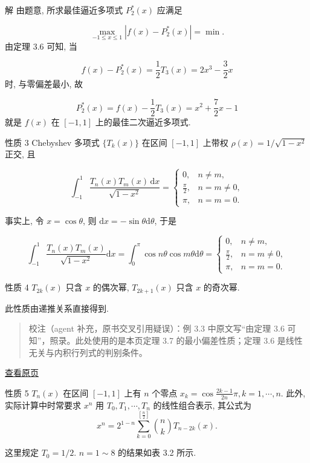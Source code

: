 \documentclass[
  10pt,
  fontset=fandol]{ctexart}
\begin{document}
解 由题意, 所求最佳逼近多项式 \(P_{2}^*(x)\) 应满足

\[
\max_{-1 \leqslant x \leqslant 1} |f(x) - P_{2}^*(x)| = \min .
\] 由定理 3.6 可知, 当

\[
f(x) - P_{2}^*(x) = \frac{1}{2} T_3(x) = 2x^3 - \frac{3}{2}x
\] 时, 与零偏差最小, 故

\[
P_{2}^*(x) = f(x) - \frac{1}{2} T_3(x) = x^2 + \frac{7}{2}x - 1
\] 就是 \(f(x)\) 在 \([-1,1]\) 上的最佳二次逼近多项式.

性质 3 Chebyshev 多项式 \(\{T_k(x)\}\) 在区间 \([-1,1]\) 上带权 \(\rho(x) = 1 / \sqrt{1-x^2}\) 正交, 且

\[
\int_{-1}^{1} \frac{T_n(x)T_m(x)\,\mathrm{d}x}{\sqrt{1-x^2}} = \begin{cases} 0, & n \neq m, \\ \frac{\pi}{2}, & n = m \neq 0, \\ \pi, & n = m = 0. \end{cases} \tag{3.4.8}
\]

事实上, 令 \(x = \cos \theta\), 则 \(\mathrm{d}x = -\sin \theta \mathrm{d}\theta\), 于是

\[
\int_{-1}^{1} \frac{T_n(x)T_m(x)}{\sqrt{1-x^2}} \mathrm{d}x = \int_{0}^{\pi} \cos n\theta \cos m\theta \mathrm{d}\theta = \begin{cases} 0, & n \neq m, \\ \frac{\pi}{2}, & n = m \neq 0, \\ \pi, & n = m = 0. \end{cases}
\]

性质 4 \(T_{2k}(x)\) 只含 \(x\) 的偶次幂, \(T_{2k+1}(x)\) 只含 \(x\) 的奇次幂.

此性质由递推关系直接得到.

\begin{quote}
校注（agent 补充，原书交叉引用疑误）：例 3.3 中原文写``由定理 3.6 可知''，照录。此处使用的是本页定理 3.7 的最小偏差性质；定理 3.6 是线性无关与内积行列式的判别条件。
\end{quote}

\href{../../source-images/pdf-075.jpeg}{查看原页}

性质 5 \(T_n(x)\) 在区间 \([-1,1]\) 上有 \(n\) 个零点 \(x_k = \cos \frac{2k-1}{2n}\pi, k=1, \cdots, n\). 此外, 实际计算中时常要求 \(x^n\) 用 \(T_0, T_1, \cdots, T_n\) 的线性组合表示, 其公式为 \[
x^n = 2^{1-n} \sum_{k=0}^{[\frac{n}{2}]} \binom{n}{k} T_{n-2k}(x). \tag{3.4.9}
\]

这里规定 \(T_0 = 1/2\). \(n=1 \sim 8\) 的结果如表 3.2 所示.
\end{document}
